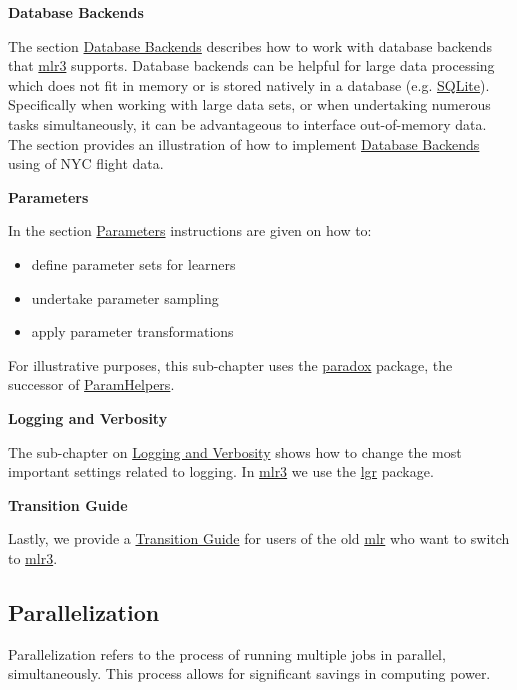 \documentclass[]{article}
\providecommand{\tightlist}{%
  \setlength{\itemsep}{0pt}\setlength{\parskip}{0pt}}
\begin{document}
\textbf{Database Backends}

The section \protect\hyperlink{backends}{Database Backends} describes how to work with database backends that \href{https://mlr3.mlr-org.com}{mlr3} supports.
Database backends can be helpful for large data processing which does not fit in memory or is stored natively in a database (e.g. \href{https://www.sqlite.org/}{SQLite}).
Specifically when working with large data sets, or when undertaking numerous tasks simultaneously, it can be advantageous to interface out-of-memory data.
The section provides an illustration of how to implement \protect\hyperlink{backends}{Database Backends} using of NYC flight data.

\textbf{Parameters}

In the section \protect\hyperlink{paradox}{Parameters} instructions are given on how to:

\begin{itemize}
\tightlist
\item
  define parameter sets for learners
\item
  undertake parameter sampling
\item
  apply parameter transformations
\end{itemize}

For illustrative purposes, this sub-chapter uses the \href{https://paradox.mlr-org.com}{paradox} package, the successor of \href{https://cran.r-project.org/package=ParamHelpers}{ParamHelpers}.

\textbf{Logging and Verbosity}

The sub-chapter on \protect\hyperlink{logging}{Logging and Verbosity} shows how to change the most important settings related to logging.
In \href{https://mlr3.mlr-org.com}{mlr3} we use the \href{https://cran.r-project.org/package=lgr}{lgr} package.

\textbf{Transition Guide}

Lastly, we provide a \protect\hyperlink{transition}{Transition Guide} for users of the old \href{https://mlr.mlr-org.com}{mlr} who want to switch to \href{https://mlr3.mlr-org.com}{mlr3}.

\hypertarget{parallelization}{%
\subsection{Parallelization}\label{parallelization}}

Parallelization refers to the process of running multiple jobs in parallel, simultaneously.
This process allows for significant savings in computing power.
\end{document}
